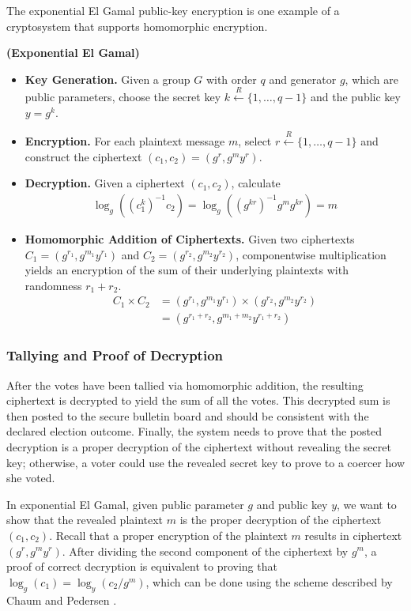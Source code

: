 The exponential El Gamal public-key encryption \cite{elgamal} is one example of a cryptosystem that supports homomorphic encryption.
\begin{definition}
\textbf{(Exponential El Gamal)}
\begin{itemize}
\item \textbf{Key Generation.} Given a group $G$ with order $q$ and generator $g$, which are public parameters, choose the secret key $k \xleftarrow{R} \{1, \dotsc, q-1\}$ and the public key $y = g^k$.
\item \textbf{Encryption.} For each plaintext message $m$, select $r \xleftarrow{R} \{1, \dotsc, q-1\}$ and construct the ciphertext $(c_1, c_2) = (g^r, g^m y^r)$.
\item \textbf{Decryption.} Given a ciphertext $(c_1, c_2)$, calculate
\begin{align*}
\log_g\left((c_1^k)^{-1} c_2\right) = \log_g\left((g^{kr})^{-1} g^m g^{kr}\right) = m
\end{align*}
\item \textbf{Homomorphic Addition of Ciphertexts.} Given two ciphertexts $C_1 = (g^{r_1}, g^{m_1} y^{r_1})$ and $C_2 = (g^{r_2}, g^{m_2} y^{r_2})$, componentwise multiplication yields an encryption of the sum of their underlying plaintexts with randomness $r_1 + r_2$.
\begin{align*}
C_1 \times C_2 &= (g^{r_1}, g^{m_1} y^{r_1}) \times (g^{r_2}, g^{m_2} y^{r_2}) \\
&= (g^{r_1 + r_2}, g^{m_1 + m_2} y^{r_1 + r_2})
\end{align*}
\end{itemize}
\end{definition}

\subsubsection{Tallying and Proof of Decryption}

After the votes have been tallied via homomorphic addition, the resulting ciphertext is decrypted to yield the sum of all the votes. This decrypted sum is then posted to the secure bulletin board and should be consistent with the declared election outcome. Finally, the system needs to prove that the posted decryption is a proper decryption of the ciphertext without revealing the secret key; otherwise, a voter could use the revealed secret key to prove to a coercer how she voted.

In exponential El Gamal, given public parameter $g$ and public key $y$, we want to show that the revealed plaintext $m$ is the proper decryption of the ciphertext $(c_1, c_2)$. Recall that a proper encryption of the plaintext $m$ results in ciphertext $(g^r, g^m y^r)$. After dividing the second component of the ciphertext by $g^m$, a proof of correct decryption is equivalent to proving that $\log_{g}(c_1) = \log_{y}(c_2/g^m)$, which can be done using the scheme described by Chaum and Pedersen \cite{chaum-pedersen}.

